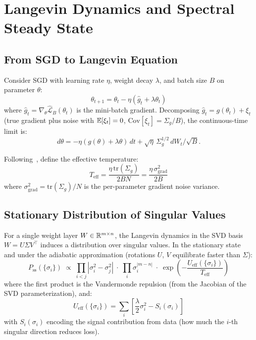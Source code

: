 \section{Langevin Dynamics and Spectral Steady State}
\label{app:langevin}

\subsection{From SGD to Langevin Equation}

Consider SGD with learning rate $\eta$, weight decay $\lambda$, and batch size $B$ on parameter $\theta$:
\begin{equation}
    \theta_{t+1} = \theta_t - \eta \left(\hat{g}_t + \lambda \theta_t\right)
\end{equation}
where $\hat{g}_t = \nabla_\theta \hat{\mathcal{L}}_B(\theta_t)$ is the mini-batch gradient. Decomposing $\hat{g}_t = g(\theta_t) + \xi_t$ (true gradient plus noise with $\mathbb{E}[\xi_t] = 0$, $\mathrm{Cov}[\xi_t] = \Sigma_g / B$), the continuous-time limit is:
\begin{equation}
    d\theta = -\eta(g(\theta) + \lambda\theta)\,dt + \sqrt{\eta}\,\Sigma_g^{1/2}\,dW_t / \sqrt{B}.
\end{equation}

Following~\citet{liu_tegmark2025}, define the effective temperature:
\begin{equation}
    T_{\mathrm{eff}} = \frac{\eta\,\mathrm{tr}(\Sigma_g)}{2BN} = \frac{\eta\,\sigma^2_{\mathrm{grad}}}{2B}
\end{equation}
where $\sigma^2_{\mathrm{grad}} = \mathrm{tr}(\Sigma_g)/N$ is the per-parameter gradient noise variance.

\subsection{Stationary Distribution of Singular Values}

For a single weight layer $W \in \mathbb{R}^{m \times n}$, the Langevin dynamics in the SVD basis $W = U\Sigma V^\top$ induces a distribution over singular values. In the stationary state and under the adiabatic approximation (rotations $U$, $V$ equilibrate faster than $\Sigma$):
\begin{equation}
    P_{\mathrm{ss}}(\{\sigma_i\}) \;\propto\; \prod_{i < j}|\sigma_i^2 - \sigma_j^2| \;\cdot\; \prod_i \sigma_i^{|m-n|} \;\cdot\; \exp\!\left(-\frac{U_{\mathrm{eff}}(\{\sigma_i\})}{T_{\mathrm{eff}}}\right)
\end{equation}
where the first product is the Vandermonde repulsion (from the Jacobian of the SVD parameterization), and:
\begin{equation}
    U_{\mathrm{eff}}(\{\sigma_i\}) = \sum_i \left[\frac{\lambda}{2}\sigma_i^2 - S_i(\sigma_i)\right]
\end{equation}
with $S_i(\sigma_i)$ encoding the signal contribution from data (how much the $i$-th singular direction reduces loss).

